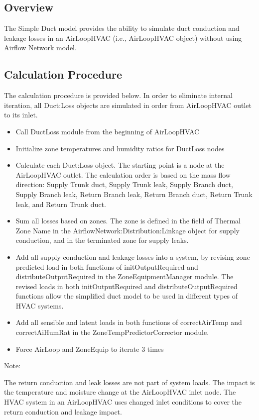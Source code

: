\subsection{Overview}\label{simple-duct-model-overview}

The Simple Duct model provides the ability to simulate duct conduction and leakage losses in an AirLoopHVAC (i.e., AirLoopHVAC object) without using Airflow Network model.

\subsection{Calculation Procedure}\label{simple-duct-model-calculation-procedure}

The calculation procedure is provided below. In order to eliminate internal iteration, all Duct:Loss objects are simulated in order from AirLoopHVAC outlet to its inlet.

\begin{itemize}
\item
  Call DuctLoss module from the beginning of AirLoopHVAC
\item
  Initialize zone temperatures and humidity ratios for DuctLoss nodes
\item
  Calculate each Duct:Loss object. The starting point is a node at the AirLoopHVAC outlet. The calculation order is based on the mass flow direction: Supply Trunk duct, Supply Trunk leak, Supply Branch duct, Supply Branch leak, Return Branch leak, Return Branch duct, Return Trunk leak, and Return Trunk duct.
\item
  Sum all losses based on zones. The zone is defined in the field of Thermal Zone Name in the AirflowNetwork:Distribution:Linkage object for supply conduction, and in the terminated zone for supply leaks.
\item
  Add all supply conduction and leakage losses into a system, by revising zone predicted load in both functions of initOutputRequired and distributeOutputRequired in the ZoneEquipmentManager module. The revised loads in both initOutputRequired and distributeOutputRequired functions allow the simplified duct model to be used in different types of HVAC systems.
\item
  Add all sensible and latent loads in both functions of correctAirTemp and correctAiHumRat in the ZoneTempPredictorCorrector module.
\item
  Force AirLoop and ZoneEquip to iterate 3 times
\end{itemize}

Note:

The return conduction and leak losses are not part of system loads. The impact is the temperature and moisture change at the AirLoopHVAC inlet node. The HVAC system in an AirLoopHVAC uses changed inlet conditions to cover the return conduction and leakage impact.

